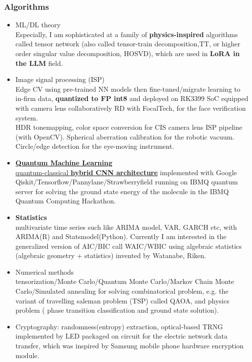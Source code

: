 \documentclass[11pt]{article}
\begin{document}
\begin{multicols*}{2}
\begin{skillbox}
\subsubsection*{Algorithms}
\begin{itemize}[noitemsep]
    \item ML/DL theory\\ Especially, I am sophisticated at a family of \textbf{physics-inspired} algorithms called tensor network (also called tensor-train decomposition,TT, or higher order singular value decomposition, HOSVD), which are used in \textbf{LoRA in the LLM} field. 
    \item Image signal processing (ISP) \\
    Edge CV using pre-trained NN models then fine-tuned/migrate learning to in-firm data,\textbf{ quantized to FP int8 }and deployed on RK3399 SoC equipped with camera lens collaboratively RD with FocalTech, for the face verification system.\\
    HDR tonemapping, color space conversion for CIS camera lens ISP pipeline (with OpenCV). Spherical aberration calibration for the robotic vacuum. \\
    Circle/edge detection for the eye-moving instrument.  
    \item \href{https://github.com/Kuo-TingKai/IBMQcamp2020_VQE_team}{\textbf{Quantum Machine Learning}\\ quantum-classical\textbf{ hybrid CNN architecture}} implemented with Google Qiskit/Tensorflow/Pannylane/Strawberryfield running on IBMQ quantum server for solving the ground state energy of the molecule in the IBMQ Quantum Computing Hackathon.\\
    \item \textbf{Statistics}\\ multivariate time series such like ARIMA model, VAR, GARCH etc, with ARIMA(R) and Statsmodel(Python). Currently I am interested in the generalized version of AIC/BIC call WAIC/WBIC using algebraic statistics (algebraic geometry + statistics) invented by Watanabe, Riken.
    \item Numerical methods\\tensorization/Monte Carlo/Quantum Monte Carlo/Markov Chain Monte Carlo/Simulated annealing for solving combinatorical problem, e.g. the variant of travelling saleman problem (TSP) called QAOA, and physics problem ( phase transition classification and ground state solution).
    \item Cryptography: randomness(entropy) extraction, optical-based TRNG implemented by LED packaged on circuit for the electric network data transfer, which was inspired by Samsung mobile phone hardware encryption module.
\end{itemize}
\end{skillbox}


\end{multicols*}
\end{document}
